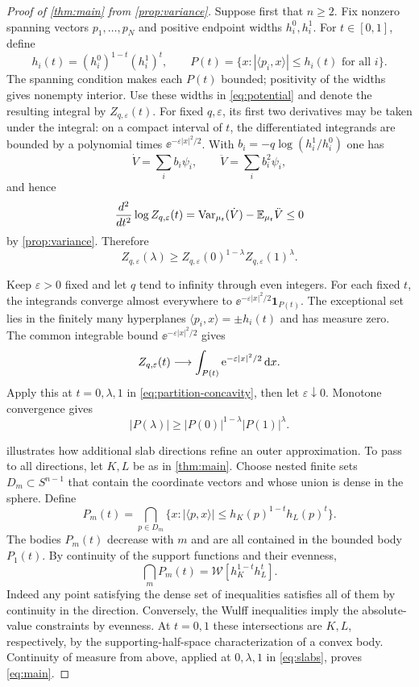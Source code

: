 \begin{proof}[Proof of \cref{thm:main} from \cref{prop:variance}]
Suppose first that $n\ge2$. Fix nonzero spanning vectors $p_1,\ldots,p_N$ and positive endpoint widths $h_i^0,h_i^1$. For $t\in[0,1]$, define
\[
 h_i(t)=(h_i^0)^{1-t}(h_i^1)^t,\qquad
 P(t)=\{x:|\langle p_i,x\rangle|\le h_i(t)\text{ for all }i\}.
\]
The spanning condition makes each $P(t)$ bounded; positivity of the widths gives nonempty interior. Use these widths in \eqref{eq:potential} and denote the resulting integral by $Z_{q,\varepsilon}(t)$. For fixed $q,\varepsilon$, its first two derivatives may be taken under the integral: on a compact interval of $t$, the differentiated integrands are bounded by a polynomial times $\ee^{-\varepsilon|x|^2/2}$. With $b_i=-q\log(h_i^1/h_i^0)$ one has
\[
 \dot V=\sum_i b_i\psi_i,\qquad
 \ddot V=\sum_i b_i^2\psi_i,
\]
and hence
\[
 \frac{d^2}{dt^2}\log Z_{q,\varepsilon}(t)
 =\operatorname{Var}_{\mu_t}(\dot V)-\mathbb{E}_{\mu_t}\ddot V\le0
\]
by \cref{prop:variance}. Therefore
\begin{equation}\label{eq:partition-concavity}
 Z_{q,\varepsilon}(\lambda)\ge
 Z_{q,\varepsilon}(0)^{1-\lambda}Z_{q,\varepsilon}(1)^\lambda.
\end{equation}

Keep $\varepsilon>0$ fixed and let $q$ tend to infinity through even integers. For each fixed $t$, the integrands converge almost everywhere to $\ee^{-\varepsilon|x|^2/2}\mathbf1_{P(t)}$. The exceptional set lies in the finitely many hyperplanes $\langle p_i,x\rangle=\pm h_i(t)$ and has measure zero. The common integrable bound $\ee^{-\varepsilon|x|^2/2}$ gives
\[
 Z_{q,\varepsilon}(t)\longrightarrow
 \int_{P(t)}\mathrm{e}^{-\varepsilon|x|^2/2}\,\mathrm{d} x.
\]
Apply this at $t=0,\lambda,1$ in \eqref{eq:partition-concavity}, then let $\varepsilon\downarrow0$. Monotone convergence gives
\begin{equation}\label{eq:slabs}
 |P(\lambda)|\ge |P(0)|^{1-\lambda}|P(1)|^\lambda.
\end{equation}



 illustrates how additional slab directions refine an outer approximation.  To pass to all directions, let $K,L$ be as in \cref{thm:main}. Choose nested finite sets $D_m\subset S^{n-1}$ that contain the coordinate vectors and whose union is dense in the sphere. Define
\[
 P_m(t)=\bigcap_{p\in D_m}
 \{x:|\langle p,x\rangle|\le h_K(p)^{1-t}h_L(p)^t\}.
\]
The bodies $P_m(t)$ decrease with $m$ and are all contained in the bounded body $P_1(t)$. By continuity of the support functions and their evenness,
\[
 \bigcap_m P_m(t)=\mathcal{W}[h_K^{1-t}h_L^t].
\]
Indeed any point satisfying the dense set of inequalities satisfies all of them by continuity in the direction. Conversely, the Wulff inequalities imply the absolute-value constraints by evenness. At $t=0,1$ these intersections are $K,L$, respectively, by the supporting-half-space characterization of a convex body. Continuity of measure from above, applied at $0,\lambda,1$ in \eqref{eq:slabs}, proves \eqref{eq:main}.


\end{proof}
